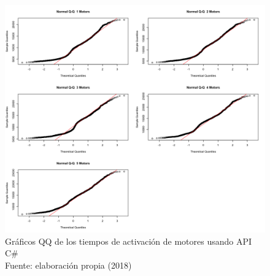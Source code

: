 \begin{figure}[H]
  \begin{center} 
   	\includegraphics[width=1.0\textwidth]{evaluation/graphics/Xamarin/Galaxy-APITest/NormalQQMotorsXamarinGalaxy-APITest.png} 
   	\centering
   	\captionsetup{justification=centering}
    \caption[Gráfico QQ delos tiempos de activación de motores usando API C\# ]{Gráficos QQ de los tiempos de activación de motores usando API C\# \\Fuente: elaboración propia (2018)} 
    \label{fig:xamarin-galaxy-QQ-motors-api}
  \end{center}
\end{figure}

